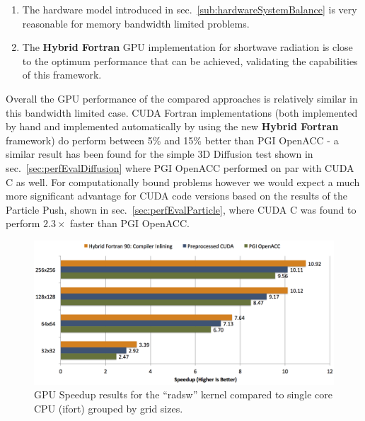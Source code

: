 \begin{enumerate}
  \begin{enumerate}
   \item The hardware model introduced in sec.~\ref{sub:hardwareSystemBalance} is very reasonable for memory bandwidth limited problems.
   \item The \textbf{Hybrid Fortran} GPU implementation for shortwave radiation is close to the optimum performance that can be achieved, validating the capabilities of this framework.
  \end{enumerate}
\end{enumerate}

Overall the GPU performance of the compared approaches is relatively similar in this bandwidth limited case. CUDA Fortran implementations (both implemented by hand and implemented automatically by using the new \textbf{Hybrid Fortran} framework) do perform between 5\% and 15\% better than PGI OpenACC - a similar result has been found for the simple 3D Diffusion test shown in sec.~\ref{sec:perfEvalDiffusion} where PGI OpenACC performed on par with CUDA C as well. For computationally bound problems however we would expect a much more significant advantage for CUDA code versions based on the results of the Particle Push, shown in sec.~\ref{sec:perfEvalParticle}, where CUDA C was found to perform $2.3\times$ faster than PGI OpenACC. 

\begin{figure}[htpb]
        \centering
        \includegraphics[width=14cm]{figures/verificationSpeedupVS1Core}
        \caption[GPU Speedup Results of Sample Implementation Compared to Single Core]{GPU Speedup results for the ``radsw'' kernel compared to single core CPU (ifort) grouped by grid sizes.}
        \label{figure:verificationSpeedupVS1Core}
\end{figure}

